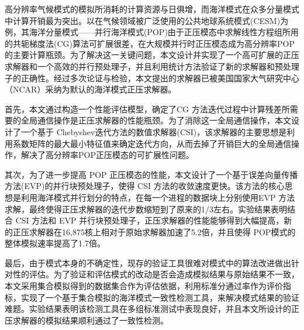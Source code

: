\begin{cabstract}
  高分辨率气候模式的模拟所消耗的计算资源与日俱增，而海洋模式在众多分量模式中计算开销最为突出。以在气候领域被广泛使用的公共地球系统模式(CESM)为例，其海洋分量模式——并行海洋模式(POP)由于正压模态中求解线性方程组所用的共轭梯度法(CG)算法可扩展很差，在大规模并行时正压模态成为高分辨率POP的主要计算瓶颈。为了解决这一关键问题，本文设计并实现了一个高可扩展的正压求解器和一个高效的并行预处理子，并且利用统计方法验证了新的求解器和预处理子的正确性。经过多次论证与检验，本文提出的求解器已被美国国家大气研究中心（NCAR）采纳为默认的海洋模式正压求解器。

  首先，本文通过构造一个性能评估模型，确定了CG 方法迭代过程中计算残差所需要的全局通信操作是正压求解器的性能瓶颈。为了消除这一全局通信操作，本文设计了一个基于 Chebyshev迭代方法的数值求解器(CSI)，该求解器的主要思想是利用系数矩阵的最大最小特征值来确定迭代方向，从而去掉了开销巨大的全局通信操作，解决了高分辨率POP正压模态的可扩展性问题。

  其次，为了进一步提高 POP 正压模态的性能，本文设计了一个基于误差向量传播方法(EVP)的并行块预处理子，使得 CSI 方法的收敛速度更快。该方法的核心思想是利用海洋模式并行划分的特点，在每一个进程的数据块上分别使用EVP 方法求解，最终使得正压求解器的迭代步数缩短到了原来的1/3左右。实验结果表明结合 CSI 方法和 EVP 并行块预处理子，正压求解器的性能能够得到大幅提高，新的正压求解器在16,875核上相对于原始求解器加速了5.2倍，并且使得 POP模式的整体模拟速率提高了1.7倍。

  最后，由于模式本身的不确定性，现存的验证工具很难对模式中的算法改进做出针对性的评估。为了验证和评估模式的改动是否会造成模拟结果与原始结果不一致，本文采用集合模拟得到的数据集合作为评估依据，利用标准分通过率作为评价指标，实现了一个基于集合模拟的海洋模式一致性检测工具，来解决模式结果的验证难题。实验结果表明该检测工具在多组标准测试中表现良好，并且本文所设计的正压求解器的模拟结果顺利通过了一致性检测。

\end{cabstract}


